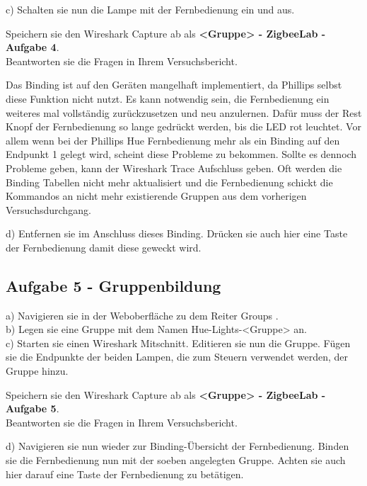 c) Schalten sie nun die Lampe mit der Fernbedienung ein und aus. 

\begin{Hinweis}
    Speichern sie den Wireshark Capture ab als \textbf{\grqq <Gruppe> - ZigbeeLab - Aufgabe 4\grqq{}}. \\
    Beantworten sie die Fragen in Ihrem Versuchsbericht.
\end{Hinweis}

\begin{Hinweis}
    Das Binding ist auf den Geräten mangelhaft implementiert, da Phillips selbst diese Funktion nicht nutzt. Es kann notwendig sein, die Fernbedienung ein weiteres mal vollständig zurückzusetzen und neu anzulernen.
    Dafür muss der Rest Knopf der Fernbedienung so lange gedrückt werden, bis die LED rot leuchtet. Vor allem wenn bei der Phillips Hue Fernbedienung mehr als ein Binding auf den Endpunkt 1 gelegt wird, scheint diese 
    Probleme zu bekommen. Sollte es dennoch Probleme geben, kann der Wireshark Trace Aufschluss geben. Oft werden die Binding Tabellen nicht mehr aktualisiert und die Fernbedienung schickt die Kommandos an nicht mehr 
    existierende Gruppen aus dem vorherigen Versuchsdurchgang.
\end{Hinweis}

d) Entfernen sie im Anschluss dieses Binding. Drücken sie auch hier eine Taste der Fernbedienung damit diese geweckt wird.

\subsection{Aufgabe 5 - Gruppenbildung}

a) Navigieren sie in der Weboberfläche zu dem Reiter \grqq Groups \grqq{}. \\
b) Legen sie eine Gruppe mit dem Namen \grqq Hue-Lights-<Gruppe> \grqq{} an.\\
c) Starten sie einen Wireshark Mitschnitt. Editieren sie nun die Gruppe. Fügen sie die Endpunkte der beiden Lampen, die zum Steuern verwendet werden, der Gruppe hinzu. \\


\begin{Aufgabe}
    Speichern sie den Wireshark Capture ab als \textbf{\grqq <Gruppe> - ZigbeeLab - Aufgabe 5\grqq{}}. \\
    Beantworten sie die Fragen in Ihrem Versuchsbericht.
\end{Aufgabe}

d) Navigieren sie nun wieder zur Binding-Übersicht der Fernbedienung. Binden sie die Fernbedienung nun mit der soeben
angelegten Gruppe. Achten sie auch hier darauf eine Taste der Fernbedienung zu betätigen.\\

